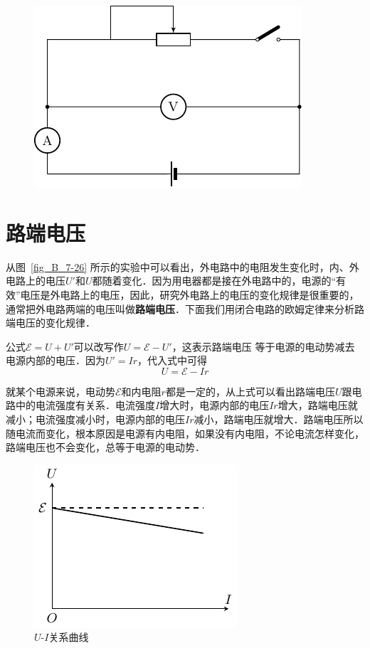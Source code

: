 \begin{enumerate}
    \begin{figure}[htbp]
        \centering
        \includegraphics{fig/B/7-30.pdf}
        \caption{}\label{fig_B_7-30}
    \end{figure}
\end{enumerate}




  

\section{路端电压}
从图~\ref{fig_B_7-26} 所示的实验中可以看出，外电路中的电阻发生变化时，内、外电路上的电压$U'$和$U$都随着变化．因为用电器都是接在外电路中的，电源的“有效”电压是外电路上的电压，因此，研究外电路上的电压的变化规律是很重要的，通常把外电路两端的电压叫做\textbf{路端电压}．下面我们用闭合电路的欧姆定律来分析路端电压的变化规律．

公式$\mathcal{E}=U+U'$可以改写作$U=\mathcal{E}-U'$，这表示路端电压
等于电源的电动势减去电源内部的电压．因为$U'=Ir$，代入式中可得
\[U=\mathcal{E}-Ir\]

就某个电源来说，电动势$\mathcal{E}$和内电阻$r$都是一定的，从上式可以看出路端电压$U$跟电路中的电流强度有关系．电流强度$I$增大时，电源内部的电压$Ir$增大，路端电压就减小；电流强度减小时，电源内部的电压$Ir$减小，路端电压就增大．路端电压所以随电流而变化，根本原因是电源有内电阻，如果没有内电阻，不论电流怎样变化，路端电压也不会变化，总等于电源的电动势．

\begin{figure}[htbp]
    \centering
    \includegraphics{fig/B/7-31.pdf}
    \caption{$U$-$I$关系曲线}\label{fig_B_7-31}
\end{figure}

